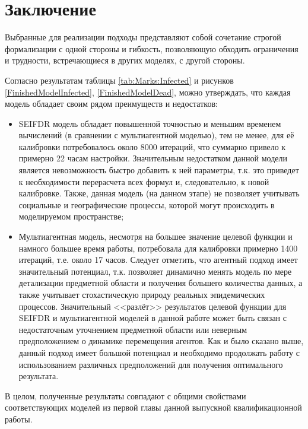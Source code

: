 \newpage
\parindent=1cm %
\section*{Заключение} %

Выбранные для реализации подходы представляют собой сочетание строгой формализации с одной стороны и гибкость, позволяющую обходить ограничения и трудности, встречающиеся в других моделях, с другой стороны. 

Согласно результатам таблицы \ref{tab:Marks:Infected} и рисунков \ref{FinishedModelInfected}, \ref{FinishedModelDead}, можно утверждать, что каждая модель обладает своим рядом преимуществ и недостатков: 
\begin{itemize}
	\item SEIFDR модель обладает  повышенной точностью и меньшим временем вычислений (в сравнении с мультиагентной моделью), тем не менее, для её калибровки потребовалось около 8000 итераций, что суммарно привело к  примерно 22 часам настройки. Значительным недостатком данной модели является невозможность быстро добавить к ней параметры, т.к. это приведет к необходимости перерасчета всех формул и, следовательно, к новой калибровке. Также, данная модель (на данном этапе) не позволяет учитывать социальные и географические процессы, которой могут происходить в моделируемом пространстве;
	\item Мультиагентная модель, несмотря на большее значение целевой функции и намного большее время работы, потребовала для калибровки примерно 1400 итераций, т.е. около 17 часов. Следует отметить, что агентный подход имеет значительный потенциал, т.к. позволяет динамично менять модель по мере детализации предметной области и получения большего количества данных, а также учитывает стохастическую природу реальных эпидемических процессов. Значительный <<разлёт>> результатов целевой функции для SEIFDR и мультиагентной моделей в данной работе может быть связан с недостаточным уточнением предметной области или неверным предположением о динамике перемещения агентов. Как и было сказано выше, данный подход имеет большой потенциал и необходимо продолжать работу с использованием различных предположений для получения оптимального результата.
\end{itemize}
В целом, полученные результаты совпадают с общими свойствами соответствующих моделей из первой главы данной выпускной квалификационной работы.



